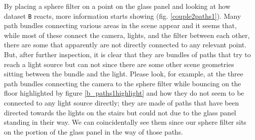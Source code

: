 By placing a sphere filter on a point on the glass panel and looking at how dataset \texttt{B} reacts, more information starts showing (fig. \ref{couple2paths1}). Many path bundles connecting various areas in the scene appear and it seems that, while most of these connect the camera, lights, and the filter between each other, there are some that apparently are not directly connected to any relevant point. But, after further inspection, it is clear that they are bundles of paths that try to reach a light source but can not since there are some other scene geometries sitting between the bundle and the light.
Please look, for example, at the three path bundles connecting the camera to the sphere filter while bouncing on the floor highlighted by figure \ref{b_paths1highlight} and how they do not seem to be connected to any light source directly; they are made of paths that have been directed towards the lights on the stairs but could not due to the glass panel standing in their way. We can coincidentally see them since our sphere filter sits on the portion of the glass panel in the way of those paths.

